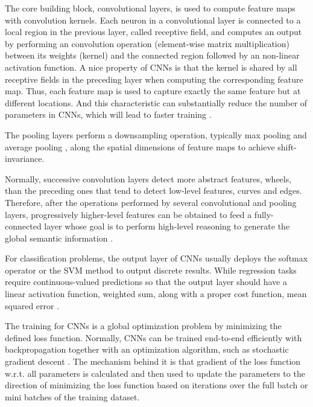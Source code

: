 The core building block, convolutional layers, is used to compute feature maps with convolution kernels. Each neuron in a convolutional layer is connected to a local region in the previous layer, called receptive field, and computes an output by performing an convolution operation (element-wise matrix multiplication) between its weights (kernel) and the connected region followed by an non-linear activation function. A nice property of CNNs is that the kernel  is shared by all receptive fields in the preceding layer when computing the corresponding feature map. Thus, each feature map is used to capture exactly the same feature but at different locations. And this characteristic can substantially reduce the number of parameters in CNNs, which will lead to faster training \cite{nndd}.  

The pooling layers perform a downsampling operation, typically max pooling \cite{Boureau:2010} and average pooling \cite{6460871}, along the spatial dimensions of feature maps to achieve shift-invariance. 

Normally, successive convolution layers detect more abstract features, \eg wheels, than the preceding ones that tend to detect low-level features, \eg curves and edges. Therefore, after the operations performed by several convolutional and pooling layers, progressively higher-level features can be obtained to feed a fully-connected layer whose goal is to perform high-level reasoning to generate the global semantic information \cite{DBLP:SimonyanZ14a, DBLP:abs-1207-0580}.

For classification problems, the output layer of CNNs usually deploys the softmax operator \cite{DBLP:Russakovsky14} or the SVM method \cite{DBLP:Tang13} to output discrete results. While regression tasks require continuous-valued predictions so that the output layer should have a linear activation function, \eg weighted sum, along with a proper cost function, \eg mean squared error \cite{DBLP:ZhouHSZ16}.

The training for CNNs is a global optimization problem by minimizing the defined loss function. Normally, CNNs can be trained end-to-end efficiently with backpropagation together with an optimization algorithm, such as stochastic gradient descent \cite{5597822}. The mechanism behind it is that gradient of the loss function w.r.t. all parameters is calculated and then used to update the parameters to the direction of minimizing the loss function based on iterations over the full batch or mini batches of the training dataset.














